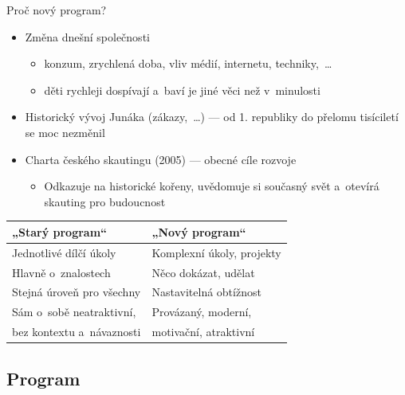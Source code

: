 \documentclass[hyperref={bookmarks=true, unicode=true, colorlinks=true, plainpages=false, pdfkeywords={Skaut, Junak, Skauting, Vychovna metoda}, linkcolor=OrangeRed, anchorcolor=OrangeRed, citecolor=RawSienna, filecolor=RawSienna, menucolor=OrangeRed, urlcolor=RawSienna, pdftex}, compress, xelatex, xcolor=dvipsnames, print]{beamer}
\begin{document}
\begin{frame}{Proč nový program?}
\begin{itemize}
\item Změna dnešní společnosti
 \begin{itemize}
 \item konzum, zrychlená doba, vliv médií, internetu, techniky,~\ldots
 \item děti rychleji dospívají a~baví je jiné věci než v~minulosti
 \end{itemize}
\item Historický vývoj Junáka (zákazy,~\ldots) --- od 1. republiky do přelomu tisíciletí se moc nezměnil
\item Charta českého skautingu (2005) --- obecné cíle rozvoje
 \begin{itemize}
 \item Odkazuje na historické kořeny, uvědomuje si současný svět a~otevírá skauting pro budoucnost
 \end{itemize}
\end{itemize}
\begin{center}
\begin{tabular}{| l | l |}
\hline
{\textbf{„Starý program“}} & {\textbf{„Nový program“}}\\
\hline\hline
Jednotlivé dílčí úkoly & Komplexní úkoly, projekty\\
\hline
Hlavně o~znalostech & Něco dokázat, udělat\\
\hline
Stejná úroveň pro všechny & Nastavitelná obtížnost\\
\hline
Sám o~sobě neatraktivní, & Provázaný, moderní,\\
bez kontextu a~návaznosti & motivační, atraktivní\\
\hline
\end{tabular}
\end{center}
\end{frame}

\subsection{Program}
\end{document}
